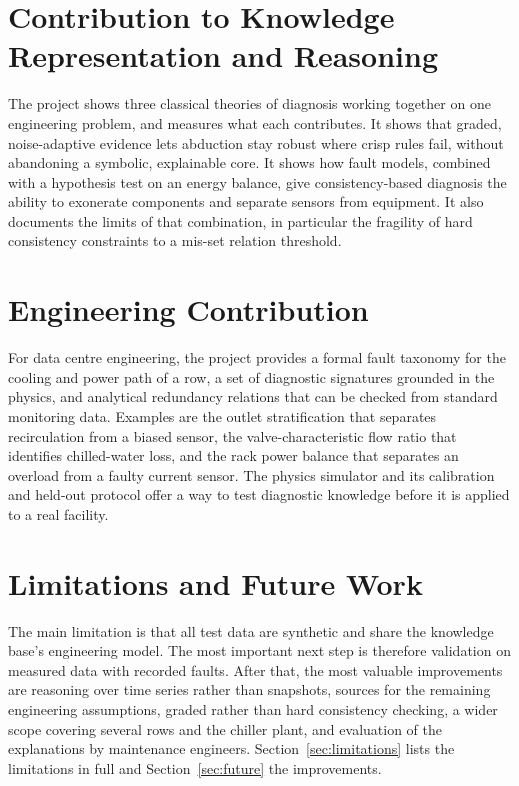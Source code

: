 \section{Contribution to Knowledge Representation and Reasoning}
\label{sec:krr-contribution}

The project shows three classical theories of diagnosis working together on one engineering problem, and measures what each contributes. It shows that graded, noise-adaptive evidence lets abduction stay robust where crisp rules fail, without abandoning a symbolic, explainable core. It shows how fault models, combined with a hypothesis test on an energy balance, give consistency-based diagnosis the ability to exonerate components and separate sensors from equipment. It also documents the limits of that combination, in particular the fragility of hard consistency constraints to a mis-set relation threshold.

\section{Engineering Contribution}
\label{sec:engineering-contribution}

For data centre engineering, the project provides a formal fault taxonomy for the cooling and power path of a row, a set of diagnostic signatures grounded in the physics, and analytical redundancy relations that can be checked from standard monitoring data. Examples are the outlet stratification that separates recirculation from a biased sensor, the valve-characteristic flow ratio that identifies chilled-water loss, and the rack power balance that separates an overload from a faulty current sensor. The physics simulator and its calibration and held-out protocol offer a way to test diagnostic knowledge before it is applied to a real facility.

\section{Limitations and Future Work}
\label{sec:conclusion-future}

The main limitation is that all test data are synthetic and share the knowledge base's engineering model. The most important next step is therefore validation on measured data with recorded faults. After that, the most valuable improvements are reasoning over time series rather than snapshots, sources for the remaining engineering assumptions, graded rather than hard consistency checking, a wider scope covering several rows and the chiller plant, and evaluation of the explanations by maintenance engineers. Section~\ref{sec:limitations} lists the limitations in full and Section~\ref{sec:future} the improvements.

